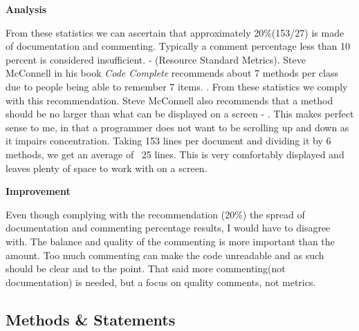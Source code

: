 		\large{\bfseries{Analysis}}
		\vspace{2mm}
		
		\normalsize
		{
			
			From these statistics we can ascertain that approximately 20\%(153/27) is made of documentation and commenting.				
			Typically a comment percentage less than 10 percent is considered insufficient. - (Resource Standard Metrics).
			Steve McConnell in his book \textit{Code Complete} recommends about 7 methods per class due to people being able to remember 7 items. 
			\citet{CodeComplete}.  From these statistics we comply with this recommendation. 
			\newline
			\newline
			Steve McConnell also recommends that a method should be no larger than what can be displayed on a screen - \citet{CodeComplete}.
			This makes perfect sense to me, in that a programmer does not want to be scrolling up and down as it impairs concentration.
			Taking 153 lines per document and dividing it by 6 methods, we get an average of ~25 lines.  This is very comfortably displayed and 
			leaves plenty of space to work with on a screen.
			\newline
		}	

		\large{\bfseries{Improvement}}
		\vspace{2mm}
		
		\normalsize
		{
			Even though complying with the recommendation (20\%) the spread of documentation and commenting 
			percentage results, I would have to disagree with.  The balance and quality of the commenting is more important than the amount.
			Too much commenting can make the code unreadable and as such should be clear and to the point.  
			That said more commenting(not documentation) is needed, but a focus on quality comments, not metrics.
			\newline
		}
		
				


\newpage

	\subsection{Methods \& Statements}
	
